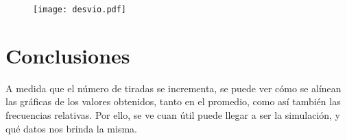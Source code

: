 \begin{figure}[H]
  \centering
  \texttt{[image: desvio.pdf]}
  \label{fig:desvio}
\end{figure}

\section{Conclusiones}
A medida que el número de tiradas se incrementa, se puede ver cómo se alínean las gráficas de los valores obtenidos, tanto en el promedio, como así también las frecuencias relativas. Por ello, se ve cuan útil puede llegar a ser la simulación, y qué datos nos brinda la misma.

  

